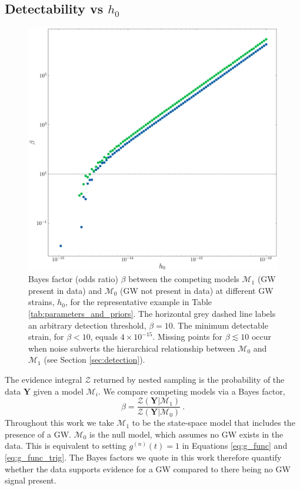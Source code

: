 \documentclass[fleqn,usenatbib,useAMS]{mnras}
\begin{document}
\subsection{Detectability vs $h_0$}\label{sec:psr_v_earth_bayes}
		
		\begin{figure}
			\includegraphics[width=\columnwidth, height = \columnwidth ]{images/CanonicalBayesPlot2000} 	
			\caption{Bayes factor (odds ratio) $\beta$ between the competing models $\mathcal{M}_1$ (GW present in data) and $\mathcal{M}_0$ (GW not present in data) at different GW strains, $h_0$, for the representative example in Table \ref{tab:parameters_and_priors}. The horizontal grey dashed line labels an arbitrary detection threshold, $\beta = 10$. The minimum detectable strain, for $\beta < 10$, equals $4 \times 10^{-15}$. Missing points for $\beta \lesssim 10$ occur when noise subverts the hierarchical relationship between $\mathcal{M}_0$ and $\mathcal{M}_1$ (see Section \ref{sec:detection}).}
			\label{fig:bayes1}
		\end{figure}
		
		
		The evidence integral $\mathcal{Z}$ returned by nested sampling is the probability of the data $\boldsymbol{Y}$ given a model $\mathcal{M}_i$. We compare competing models via a Bayes factor,
		\begin{equation}
			\beta = \frac{\mathcal{Z}(\boldsymbol{Y} | \mathcal{M}_1)}{\mathcal{Z}(\boldsymbol{Y} | \mathcal{M}_0)} \ . \label{eq:bayes}
		\end{equation}
		Throughout this work we take $\mathcal{M}_1$ to be the state-space model that includes the presence of a GW. $\mathcal{M}_0$ is the null model, which assumes no GW exists in the data. This is equivalent to setting $g^{(n)}(t)=1$ in Equations \eqref{eq:g_func} and \eqref{eq:g_func_trig}. The Bayes factors we quote in this work therefore quantify whether the data supports evidence for a GW compared to there being no GW signal present.
		
\end{document}
